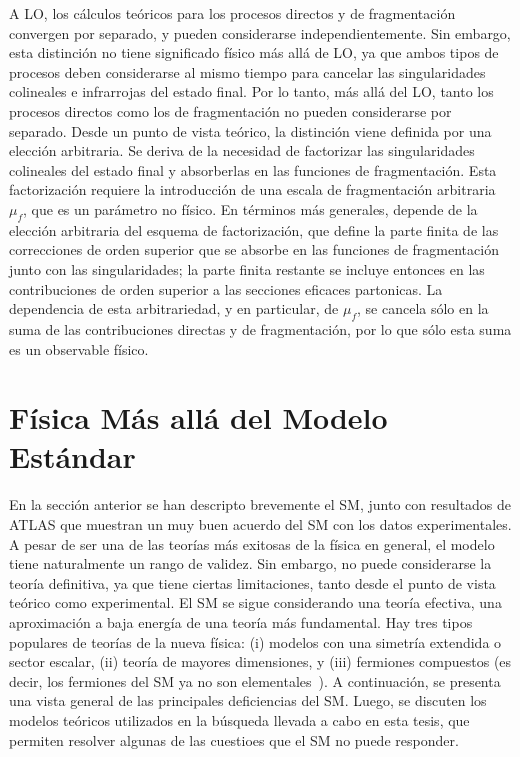 A \ac{LO}, los cálculos teóricos para los procesos directos y de fragmentación convergen por separado, y pueden considerarse independientemente. Sin embargo, esta distinción no tiene significado físico más allá de \ac{LO}, ya que ambos tipos de procesos deben considerarse al mismo tiempo para cancelar las singularidades colineales e infrarrojas del estado final. Por lo tanto, más allá del \ac{LO}, tanto los procesos directos como los de fragmentación no pueden considerarse por separado. Desde un punto de vista teórico, la distinción viene definida por una elección arbitraria. Se deriva de la necesidad de factorizar las singularidades colineales del estado final y absorberlas en las funciones de fragmentación. Esta factorización requiere la introducción de una escala de fragmentación arbitraria \(\mu_f\), que es un parámetro no físico. En términos más generales, depende de la elección arbitraria del esquema de factorización, que define la parte finita de las correcciones de orden superior que se absorbe en las funciones de fragmentación junto con las singularidades; la parte finita restante se incluye entonces en las contribuciones de orden superior a las secciones eficaces partonicas. La dependencia de esta arbitrariedad, y en particular, de \(\mu_f\), se cancela sólo en la suma de las contribuciones directas y de fragmentación, por lo que sólo esta suma es un observable físico.






\section{F\'isica M\'as all\'a del Modelo Est\'andar}
\label{sec:theory:bsm}

En la sección anterior se han descripto brevemente el \ac{SM}, junto con resultados de \ac{ATLAS} que muestran un muy buen acuerdo del \ac{SM} con los datos experimentales. A pesar de ser una de las teorías más exitosas de la física en general, el modelo tiene naturalmente un rango de validez.
Sin embargo, no puede considerarse la teoría definitiva, ya que tiene ciertas limitaciones, tanto desde el punto de vista teórico como experimental. El \ac{SM} se sigue considerando una teoría efectiva, una aproximación a baja energía de una teoría más fundamental. Hay tres tipos populares de teorías de la nueva física: (i) modelos con una simetría extendida o sector escalar, (ii) teoría de mayores dimensiones, y (iii) fermiones compuestos (es decir, los fermiones del \ac{SM} ya no son elementales~\cite{Kuhn_Zherwas-1984,Cabibbo_Maiani_Srivastava-1984,DeRújula_Maiani_Petronzio-1984,Baur_Spira_Zerwas-1990,Bhattacharya_Chauhan_Choudhary_Choudhury-2009,Zhan_Li_Liu_Li-2016}).
A continuación, se presenta una vista general de las principales deficiencias del \ac{SM}. Luego, se discuten los modelos teóricos utilizados en la búsqueda llevada a cabo en esta tesis, que permiten resolver algunas de las cuestioes que el \ac{SM} no puede responder.

